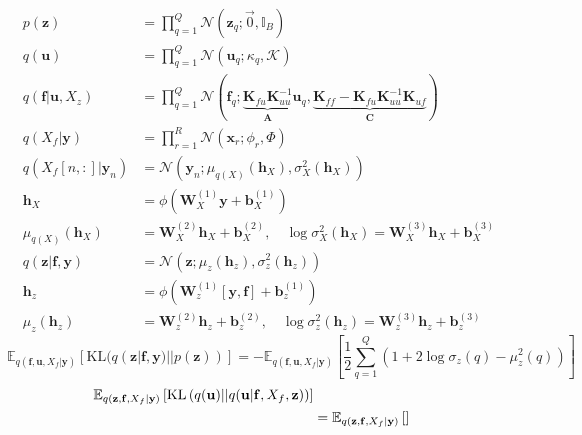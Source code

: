 \documentclass[12pt]{article}
\newcommand{\Kappa}{\mathcal{K}}
\newcommand{\xb}{\mathbf{x}}
\newcommand{\ub}{\mathbf{u}}
\newcommand{\zb}{\mathbf{z}}
\newcommand{\fb}{\mathbf{f}}
\newcommand{\Cb}{\mathbf{C}}
\newcommand{\Ab}{\mathbf{A}}
\newcommand{\yb}{\mathbf{y}}
\newcommand{\Kff}{\mathbf{K}_{ff}}
\newcommand{\Kuu}{\mathbf{K}_{uu}}
\newcommand{\Kuf}{\mathbf{K}_{uf}}
\newcommand{\Kfu}{\mathbf{K}_{fu}}
\newcommand{\Ex}{\mathbb{E}}
\newcommand{\KL}{\mathrm{KL}}
\newcommand{\No}{\mathcal{N}}
\newcommand{\Wb}{\mathbf{W}}
\newcommand{\hb}{\mathbf{h}}
\newcommand{\bb}{\mathbf{b}}
\begin{document}
\begin{align}
p(\zb) &= \prod_{q=1}^Q \mathcal{N}(\zb_q; \vec{0}, \mathbb{I}_B) \\
q(\ub) &= \prod_{q=1}^Q \mathcal{N}(\ub_q; \kappa_q, \Kappa) \\
q(\fb|\ub,X_z) &= \prod_{q=1}^Q \mathcal{N}(\fb_q; \underbrace{\Kfu\Kuu^{-1}}_{\Ab}\ub_q, \underbrace{\Kff-\Kfu\Kuu^{-1}\Kuf}_{\Cb}) \\
q(X_f|\yb) &= \prod_{r=1}^R \mathcal{N}(\xb_r; \phi_r, \Phi) \\
q(X_f[n,:]|\yb_n) &= \No(\yb_n; \mu_{q(X)}(\hb_X), \sigma^2_X(\hb_X)) \\
\hb_X &= \phi(\Wb^{(1)}_X\yb + \bb^{(1)}_X) \\
\mu_{q(X)}(\hb_X) &= \Wb^{(2)}_X\hb_X + \bb^{(2)}_X,\quad \log\sigma^2_X(\hb_X) = \Wb^{(3)}_X\hb_X + \bb^{(3)}_X \\
q(\zb|\fb,\yb) &= \No(\zb; \mu_z(\hb_z), \sigma^2_z(\hb_z)) \\
\hb_z &= \phi(\Wb^{(1)}_z[\yb,\fb] + \bb^{(1)}_z) \\
\mu_z(\hb_z) &= \Wb^{(2)}_z\hb_z + \bb^{(2)}_z,\quad \log\sigma^2_z(\hb_z) = \Wb^{(3)}_z\hb_z + \bb^{(3)}_z
\end{align}
%
\begin{equation}
\Ex_{q(\fb,\ub,X_f|\yb)}\left[\KL(q(\zb|\fb,\yb)||p(\zb))\right] = -\Ex_{q(\fb,\ub,X_f|\yb)}\left[ \frac{1}{2}\sum_{q=1}^Q\left( 1 + 2\log\sigma_z(q) - \mu^2_z(q) \right) \right]
\end{equation}
%
\begin{align}
    \Ex_{q(\zb,\fb,X_f|\yb)}\left[ \KL\left( q(\ub)||q(\ub|\fb,X_f,\zb) \right) \right]\notag\\
    &= \Ex_{q(\zb,\fb,X_f|\yb)}\left[  \right]
\end{align}
\end{document}
